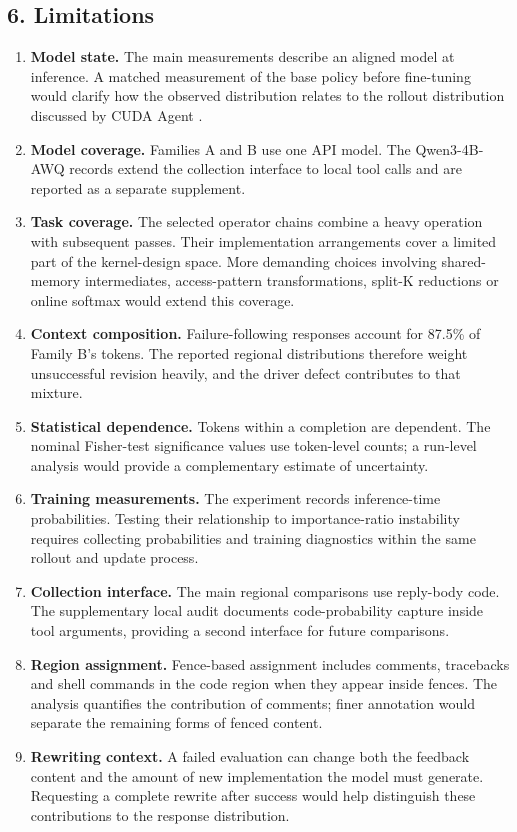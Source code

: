 \documentclass[
  11pt,
]{article}
\providecommand{\tightlist}{%
  \setlength{\itemsep}{0pt}\setlength{\parskip}{0pt}}
\begin{document}
\hypertarget{limitations}{%
\subsection{6. Limitations}\label{limitations}}

\begin{enumerate}
\def\labelenumi{\arabic{enumi}.}
\tightlist
\item
  \textbf{Model state.} The main measurements describe an aligned model
  at inference. A matched measurement of the base policy before
  fine-tuning would clarify how the observed distribution relates to the
  rollout distribution discussed by CUDA Agent
  \citep{cudaagent, surrogate}.
\item
  \textbf{Model coverage.} Families A and B use one API model. The
  Qwen3-4B-AWQ records extend the collection interface to local tool
  calls and are reported as a separate supplement.
\item
  \textbf{Task coverage.} The selected operator chains combine a heavy
  operation with subsequent passes. Their implementation arrangements
  cover a limited part of the kernel-design space. More demanding
  choices involving shared-memory intermediates, access-pattern
  transformations, split-K reductions or online softmax would extend
  this coverage.
\item
  \textbf{Context composition.} Failure-following responses account for
  87.5\% of Family B's tokens. The reported regional distributions
  therefore weight unsuccessful revision heavily, and the driver defect
  contributes to that mixture.
\item
  \textbf{Statistical dependence.} Tokens within a completion are
  dependent. The nominal Fisher-test significance values use token-level
  counts; a run-level analysis would provide a complementary estimate of
  uncertainty.
\item
  \textbf{Training measurements.} The experiment records inference-time
  probabilities. Testing their relationship to importance-ratio
  instability requires collecting probabilities and training diagnostics
  within the same rollout and update process.
\item
  \textbf{Collection interface.} The main regional comparisons use
  reply-body code. The supplementary local audit documents
  code-probability capture inside tool arguments, providing a second
  interface for future comparisons.
\item
  \textbf{Region assignment.} Fence-based assignment includes comments,
  tracebacks and shell commands in the code region when they appear
  inside fences. The analysis quantifies the contribution of comments;
  finer annotation would separate the remaining forms of fenced content.
\item
  \textbf{Rewriting context.} A failed evaluation can change both the
  feedback content and the amount of new implementation the model must
  generate. Requesting a complete rewrite after success would help
  distinguish these contributions to the response distribution.
\end{enumerate}
\end{document}
